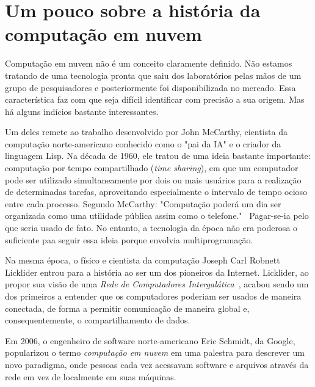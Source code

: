 \section{Um pouco sobre a história da computação em nuvem}

Computação em nuvem não é um conceito claramente definido. Não estamos tratando de
uma tecnologia pronta que saiu dos laboratórios pelas mãos de um grupo de
pesquisadores e posteriormente foi disponibilizada no mercado. Essa característica
faz com que seja difícil identificar com precisão a sua origem. Mas há alguns
indícios bastante interessantes.

Um deles remete ao trabalho desenvolvido por John McCarthy, cientista da computação 
norte-americano conhecido como o "pai da IA" e o criador da linguagem Lisp. Na 
década de 1960, ele tratou de uma ideia bastante importante: computação por tempo 
compartilhado (\emph{time sharing}), em que um computador pode ser utilizado 
simultaneamente por dois ou mais usuários para a realização de determinadas tarefas, 
aproveitando especialmente o intervalo de tempo ocioso entre cada processo. Segundo 
McCarthy: "Computação poderá um dia ser organizada como uma utilidade pública assim 
como o telefone."~\cite{meersman2010move} Pagar-se-ia pelo que seria usado de fato. 
No entanto, a tecnologia da época não era poderosa o suficiente paa seguir essa 
ideia porque envolvia multiprogramação.

Na mesma época, o físico e cientista da computação Joseph Carl Robnett Licklider 
entrou para a história ao ser um dos pioneiros da Internet. Licklider, ao propor sua 
visão de uma \emph{Rede de Computadores 
Intergalática}~\cite{computerweekly-history-cloud-computing}, acabou sendo um dos 
primeiros a entender que os computadores poderiam ser usados de maneira conectada, 
de forma a permitir comunicação de maneira global e, consequentemente, o 
compartilhamento de dados.

Em 2006, o engenheiro de software norte-americano Eric Schmidt, da Google, 
popularizou o termo \emph{computação em nuvem} em uma palestra 
\cite{google-eric-schmidt} para descrever um novo paradigma, onde pessoas cada vez 
acessavam software e arquivos através da rede em vez de localmente em suas máquinas.

